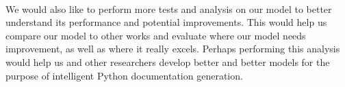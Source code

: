 \documentclass[12pt]{article}
\begin{document}
	\paragraph{} We would also like to perform more tests and analysis on our model to better understand its performance and potential improvements. This would help us compare our model to other works and evaluate where our model needs improvement, as well as where it really excels. Perhaps performing this analysis would help us and other researchers develop better and better models for the purpose of intelligent Python documentation generation.

	\pagebreak
	
	
\end{document}
